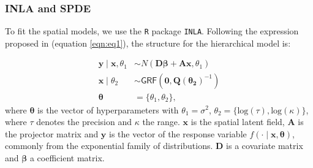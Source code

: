 \documentclass{article}
\begin{document}
\subsubsection{INLA and SPDE}

To fit the  spatial models, we use the \texttt{R} package \texttt{INLA}. Following the expression proposed in (equation \ref{eqn:eq1}), the structure for the hierarchical model is: %



\begin{align}
\mathbf{y} \mid \mathbf{x}, \theta_{1} & \sim N(\boldsymbol{D\beta} + \mathbf{A} \mathbf{x}, \theta_{1}) \label{eqn:eq3}\\
\mathbf{x} \mid \theta_{2} & \sim \mathsf{GRF}(\boldsymbol{0}, \boldsymbol{Q(\theta_{2})}^{-1}) \label{eqn:eq4}\\
\boldsymbol{\theta} & = \{\theta_{1}, \theta_{2}\},\label{eqn:eq5}
\end{align}
where $\boldsymbol{\theta}$ is the vector of hyperparameters with $\theta_{1} = \sigma^{2}$, $\theta_{2} = \{\text{log}(\tau), \text{log}(\kappa)\}$, where $\tau$ denotes the precision and $\kappa$ the range.  $\boldsymbol{x}$ is the spatial latent field, $\boldsymbol{A}$ is the projector matrix and $\boldsymbol{y}$ is the vector of the response variable $f(\cdot \mid \boldsymbol{x}, \boldsymbol{\theta})$, commonly from the exponential family of distributions. $\boldsymbol{D}$ is a covariate matrix and $\boldsymbol{\beta}$ a coefficient matrix. 
\end{document}
